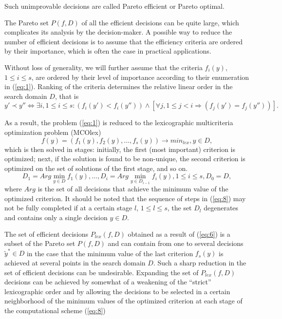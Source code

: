 \documentclass[smallextended]{svjour3}       %
\begin{document}
Such unimprovable decisions are called Pareto efficient or Pareto optimal.

The Pareto set $P(f,D)$ of all the efficient decisions can be quite large, which complicates its analysis by the decision-maker. A possible way to reduce the number of efficient decisions is to assume that the efficiency criteria are ordered by their importance, which is often the case in practical applications.

Without loss of generality, we will further assume that the criteria $f_i(y)$, $1 \leq i \leq s$, are ordered by their level of importance according to their enumeration in (\ref{eq:1}). Ranking of the criteria determines the relative linear order in the search domain $D$, that is
\begin{equation}\label{eq:6}
y' \prec y'' \Leftrightarrow \exists i, 1 \leq i \leq s: (f_i(y')<f_i(y'')) \wedge [ \forall j, 1 \leq j <i \Rightarrow (f_j(y')=f_j(y'')) ].
\end{equation}

As a result, the problem (\ref{eq:1}) is reduced to the lexicographic multicriteria optimization problem (MCOlex)
\begin{equation}\label{eq:7}
f(y) = (f_1(y), f_2(y), \dots , f_s(y)) \to min_{lex},  y \in D,
\end{equation}
which is then solved in stages: initially, the first (most important) criterion is optimized; next, if the solution is found to be non-unique, the second criterion is optimized on the set of solutions of the first stage, and so on.
\begin{equation}\label{eq:8}
D_1=Arg \min_{y \in D}{f_1(y)},\dots, D_i=Arg \min_{y \in D_{i-1}}{f_i(y)},1 \leq i \leq s,D_0=D,
\end{equation}
where $Arg$ is the set of all decisions that achieve the minimum value of the optimized criterion. It should be noted that the sequence of steps in (\ref{eq:8}) may not be fully completed if at a certain stage $l$, $1 \leq l \leq s$, the set $D_l$ degenerates and contains only a single decision $y \in D$.

The set of efficient decisions $P_{lex}(f,D)$ obtained as a result of (\ref{eq:6}) is a subset of the Pareto set $P(f,D)$ and can contain from one to several decisions $\widetilde{y}^* \in D$ in the case that the minimum value of the last criterion $f_s(y)$ is achieved at several points in the search domain $D$. Such a sharp reduction in the set of efficient decisions can be undesirable. Expanding the set of $P_{lex}(f,D)$ decisions can be achieved by somewhat of a weakening of the ``strict'' lexicographic order and by allowing the decisions to be selected in a certain neighborhood of the minimum values of the optimized criterion at each stage of the computational scheme (\ref{eq:8})
\end{document}
